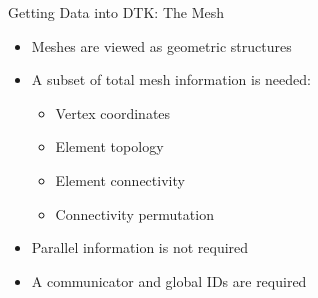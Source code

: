 \documentclass{beamer}
\begin{document}
\begin{frame}{Getting Data into DTK: The Mesh}
  
  \begin{itemize}
    \item Meshes are viewed as geometric structures
      \medskip
    \item A subset of total mesh information is needed:
      \medskip
      \begin{itemize}
        \item Vertex coordinates
        \item Element topology
        \item Element connectivity
        \item Connectivity permutation
      \end{itemize}
      \medskip
    \item Parallel information is not required
      \medskip
    \item A communicator and global IDs are required
  \end{itemize}

\end{frame}
\end{document}

